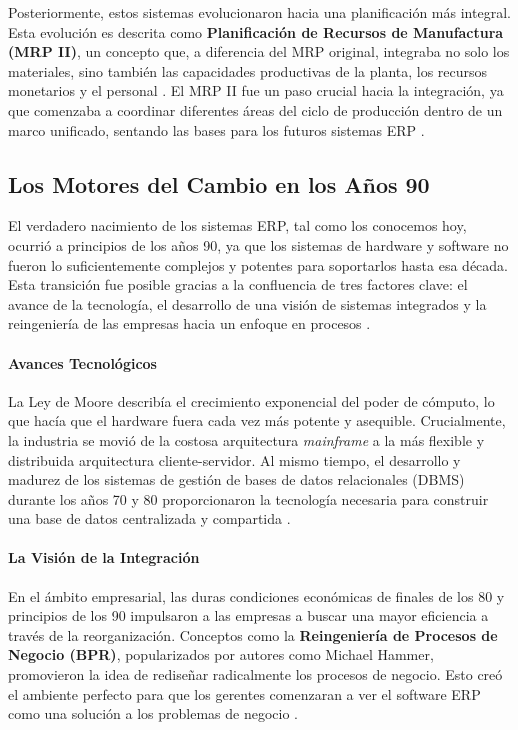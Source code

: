 \documentclass[12pt,letterpaper,spanish]{report}
\begin{document}
Posteriormente, estos sistemas evolucionaron hacia una planificación más integral. Esta evolución es descrita como \textbf{Planificación de Recursos de Manufactura (MRP II)}, un concepto que, a diferencia del MRP original, integraba no solo los materiales, sino también las capacidades productivas de la planta, los recursos monetarios y el personal \citep{Miño-Cascante_Saumell-Fonseca_Toledo-Borrego_Roldan-Ruenes_Moreno-García_2015}. El MRP II fue un paso crucial hacia la integración, ya que comenzaba a coordinar diferentes áreas del ciclo de producción dentro de un marco unificado, sentando las bases para los futuros sistemas ERP \citep{Miño-Cascante_Saumell-Fonseca_Toledo-Borrego_Roldan-Ruenes_Moreno-García_2015}.


\subsection{Los Motores del Cambio en los Años 90}
El verdadero nacimiento de los sistemas ERP, tal como los conocemos hoy, ocurrió a principios de los años 90, ya que los sistemas de hardware y software no fueron lo suficientemente complejos y potentes para soportarlos hasta esa década. Esta transición fue posible gracias a la confluencia de tres factores clave: el avance de la tecnología, el desarrollo de una visión de sistemas integrados y la reingeniería de las empresas hacia un enfoque en procesos \cite{book}.

\paragraph{Avances Tecnológicos} La Ley de Moore describía el crecimiento exponencial del poder de cómputo, lo que hacía que el hardware fuera cada vez más potente y asequible. Crucialmente, la industria se movió de la costosa arquitectura \textit{mainframe} a la más flexible y distribuida arquitectura cliente-servidor. Al mismo tiempo, el desarrollo y madurez de los sistemas de gestión de bases de datos relacionales (DBMS) durante los años 70 y 80 proporcionaron la tecnología necesaria para construir una base de datos centralizada y compartida \cite{book}.

\paragraph{La Visión de la Integración} En el ámbito empresarial, las duras condiciones económicas de finales de los 80 y principios de los 90 impulsaron a las empresas a buscar una mayor eficiencia a través de la reorganización. Conceptos como la \textbf{Reingeniería de Procesos de Negocio (BPR)}, popularizados por autores como Michael Hammer, promovieron la idea de rediseñar radicalmente los procesos de negocio. Esto creó el ambiente perfecto para que los gerentes comenzaran a ver el software ERP como una solución a los problemas de negocio \cite{book}.
\end{document}
